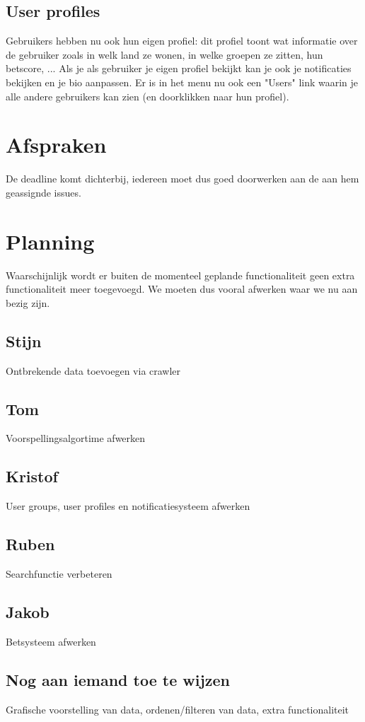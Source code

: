 \documentclass[11pt, a4paper]{article}
\begin{document}
\subsection{User profiles}
Gebruikers hebben nu ook hun eigen profiel: dit profiel toont wat informatie over de gebruiker zoals in welk land ze wonen, in welke groepen ze zitten, hun betscore, ...
Als je als gebruiker je eigen profiel bekijkt kan je ook je notificaties bekijken en je bio aanpassen.
Er is in het menu nu ook een "Users" link waarin je alle andere gebruikers kan zien (en doorklikken naar hun profiel).

\section{Afspraken}
De deadline komt dichterbij, iedereen moet dus goed doorwerken aan de aan hem geassignde issues.


\section{Planning}
Waarschijnlijk wordt er buiten de momenteel geplande functionaliteit geen extra functionaliteit meer toegevoegd. We moeten dus vooral afwerken waar we nu aan bezig zijn.
\subsection{Stijn}
Ontbrekende data toevoegen via crawler
\subsection{Tom}
Voorspellingsalgortime afwerken
\subsection{Kristof}
User groups, user profiles en notificatiesysteem afwerken
\subsection{Ruben}
Searchfunctie verbeteren
\subsection{Jakob}
Betsysteem afwerken
\subsection{Nog aan iemand toe te wijzen}
Grafische voorstelling van data, ordenen/filteren van data, extra functionaliteit
\end{document}
